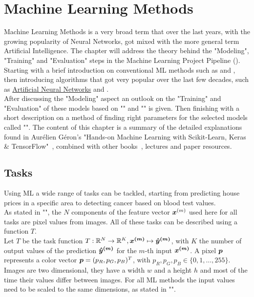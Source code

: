 \section{Machine Learning Methods}\label{sec:machine-learning-methods}
Machine Learning Methods is a very broad term that over the last years, with the growing popularity of Neural Networks, got mixed with the more general term Artificial Intelligence.
The chapter will address the theory behind the "Modeling", "Training" and "Evaluation" steps in the Machine Learning Project Pipeline ().
Starting with a brief introduction on conventional ML methods such as  and , then introducing algorithms that got very popular over the last few decades, such as \hyperref[subsec:neural-networks]{Artificial Neural Networks} and .\\
After discussing the "Modeling" aspect an outlook on the "Training" and "Evaluation" of these models based on "" and "" is given.
Then finishing with a short description on a method of finding right parameters for the selected models called "".
The content of this chapter is a summary of the detailed explanations found in Aurélien Géron's "Hands-on Machine Learning with Scikit-Learn, Keras \& Tensor\-Flow"~\cite{handsOn}, combined with other books~\cite{ml-book}, lectures and paper resources.

\subsection{Tasks}\label{subsec:tasks}
Using ML a wide range of tasks can be tackled, starting from predicting house prices in a specific area to detecting cancer based on blood test values.\\
As stated in "", the $N$ components of the feature vector $\bm{x}^{(m)}$ used here for all tasks are pixel values from images.
All of these tasks can be described using a function $T$.\\
Let $T$ be the task function
$T: \mathbb{R}^{N} \rightarrow \mathbb{R}^K, \bm{x^{(m)}} \mapsto \bm{\hat{y}^{(m)}}$, with $K$ the number of output values of the prediction $\bm{\hat{y}^{(m)}}$ for the $m$-th input $\bm{x^{(m)}}$.
A pixel $\bm{p}$ represents a color vector $\bm{p}=(p_R, p_G, p_B)^T$, with $p_R, p_G, p_B \in \{0, 1,\ldots, 255\}$.
Images are two dimensional, they have a width $w$ and a height $h$ and most of the time their values differ between images.
For all ML methods the input values need to be scaled to the same dimensions, as stated in "".

